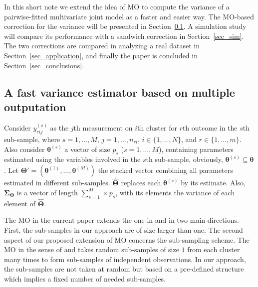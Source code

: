 \documentclass[11pt,a5paper,twoside]{book}
\begin{document}
{}



In this short note we extend the idea of MO to compute the variance of a pairwise-fitted multivariate joint model as a faster and easier way. The MO-based correction for the variance will be presented in Section~\ref{sec_method}. A simulation study will compare its performance with a sandwich correction in Section~\ref{sec_sim}. The two corrections are compared in analyzing a real dataset in Section~\ref{sec_application}, and finally the paper is concluded in Section~\ref{sec_conclusions}.

\subsection{A fast variance estimator based on multiple outputation}
\label{sec_method}
Consider $y^{(s)}_{rij}$ as the $j$th measurement on $i$th cluster for $r$th outcome in the $s$th sub-sample, where $s=1,\ldots ,M$, $j=1,\ldots,n_{ri}$, $i\in \{1,\ldots,N\}$, and $r\in \{1,\ldots,m\}$. Also consider $\boldsymbol{\theta}^{(s)}$ a vector of size $p_s$ ($s=1,\ldots,M$), containing parameters estimated using the variables involved in the $s$th sub-sample, obviously, $\boldsymbol{\theta}^{(s)} \subseteq \boldsymbol{\theta}$. Let $\boldsymbol{\Theta}' = (\boldsymbol{\theta}^{(1)},\ldots,\boldsymbol{\theta}^{(M)})$ the stacked vector combining all parameters estimated in different sub-samples. $\widehat{\boldsymbol{\Theta}}$ replaces each $\boldsymbol{\theta}^{(s)}$ by its estimate. Also, $\boldsymbol{\Sigma}_{\boldsymbol{\Theta}}$ is a vector of length $\sum_{s=1}^M\times p_s$, with its elements the variance of each element of $\widehat{\boldsymbol{\Theta}}$.


The MO in the current paper extends the one in \cite{hoffman2001} and \cite{follmann2003} in two main directions. First, the sub-samples in our approach are of size larger than one. The second aspect of our proposed extension of MO concerns the sub-sampling scheme. The MO in the sense of \cite{hoffman2001} and \cite{follmann2003} takes random sub-samples of size $1$ from each cluster many times to form sub-samples of independent observations. In our approach, the sub-samples are not taken at random but based on a pre-defined structure which implies a fixed number of needed sub-samples.  {} 
\end{document}
